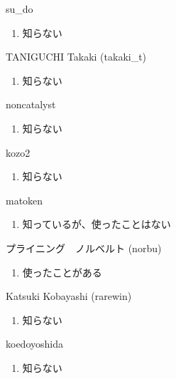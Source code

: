 \begin{prework}{ su\_do }
  \begin{enumerate}
  \item 知らない
  \end{enumerate}
\end{prework}

\begin{prework}{ TANIGUCHI Takaki (takaki\_t) }
  \begin{enumerate}
  \item 知らない
  \end{enumerate}
\end{prework}

\begin{prework}{ noncatalyst }
  \begin{enumerate}
  \item 知らない
  \end{enumerate}
\end{prework}

\begin{prework}{ kozo2 }
  \begin{enumerate}
  \item 知らない
  \end{enumerate}
\end{prework}

\begin{prework}{ matoken }
  \begin{enumerate}
  \item 知っているが、使ったことはない
  \end{enumerate}
\end{prework}

\begin{prework}{ プライニング　ノルベルト (norbu) }
  \begin{enumerate}
  \item 使ったことがある
  \end{enumerate}
\end{prework}

\begin{prework}{ Katsuki Kobayashi (rarewin) }
  \begin{enumerate}
  \item 知らない
  \end{enumerate}
\end{prework}

\begin{prework}{ koedoyoshida }
  \begin{enumerate}
  \item 知らない
  \end{enumerate}
\end{prework}

